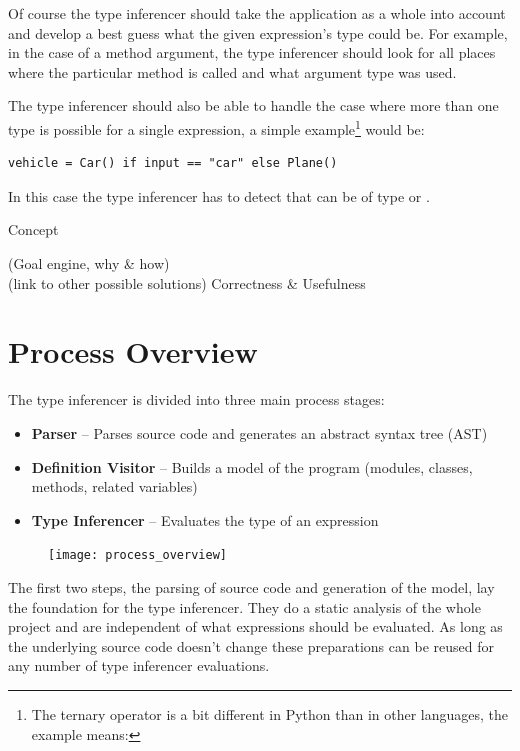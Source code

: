 \documentclass[12pt,halfparskip,DIV11,BCOR10mm]{scrreprt}
\begin{document}
Of course the type inferencer should take the application as a whole into account and develop a best guess what the given expression's type could be. For example, in the case of a method argument, the type inferencer should look for all places where the particular method is called and what argument type was used.

The type inferencer should also be able to handle the case where more than one type is possible for a single expression, a simple example\footnote{The ternary operator is a bit different in Python than in other languages, the example means: } would be:

\begin{lstlisting}
vehicle = Car() if input == "car" else Plane()
\end{lstlisting}

In this case the type inferencer has to detect that  can be of type  or .

{Concept}

(Goal engine, why \& how) \\
(link to other possible solutions)
Correctness \& Usefulness


\section{Process Overview}

The type inferencer is divided into three main process stages:

\begin{itemize}
	\item \textbf{Parser} – Parses source code and generates an abstract syntax tree (AST)
	\item \textbf{Definition Visitor} – Builds a model of the program (modules, classes, methods, related variables)
	\item \textbf{Type Inferencer} – Evaluates the type of an expression
\end{itemize}

\begin{figure}[h!]
 \centering
 \texttt{[image: process\_overview]}
 \label{fig:process_overview}
\end{figure}

The first two steps, the parsing of source code and generation of the model, lay the foundation for the type inferencer. They do a static analysis of the whole project and are independent of what expressions should be evaluated. As long as the underlying source code doesn't change these preparations can be reused for any number of type inferencer evaluations.
\end{document}
